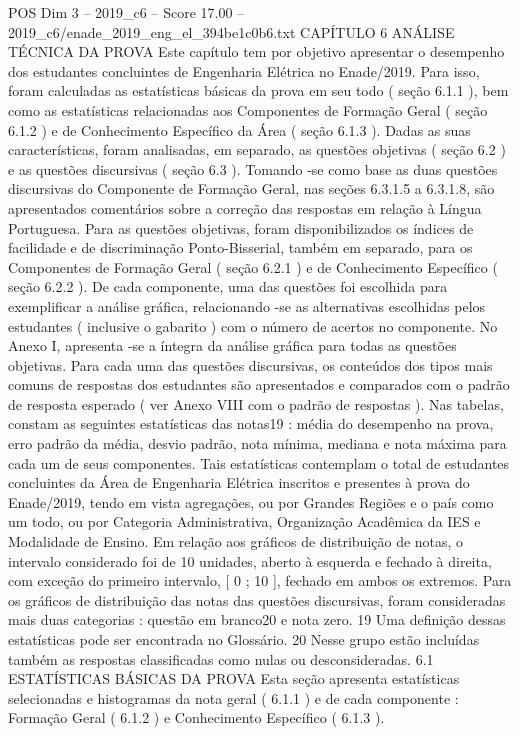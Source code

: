 \begin{textsample}{POS Dim 3 – 2019\_c6 – Score 17.00 – 2019\_c6/enade\_2019\_eng\_el\_394be1c0b6.txt}  \label{ex:f3_pos_007}
CAPÍTULO 6 ANÁLISE TÉCNICA DA PROVA Este capítulo tem por objetivo apresentar o desempenho dos estudantes concluintes de Engenharia Elétrica no Enade/2019.
Para isso, foram calculadas as estatísticas básicas da prova em seu todo ( seção 6.1.1 ), bem como as estatísticas relacionadas aos Componentes de Formação Geral ( seção 6.1.2 ) e de Conhecimento Específico da Área ( seção 6.1.3 ).
Dadas as suas características, foram analisadas, em separado, as questões objetivas ( seção 6.2 ) e as questões discursivas ( seção 6.3 ).
Tomando -se como base as duas questões discursivas do Componente de Formação Geral, nas seções 6.3.1.5 a 6.3.1.8, são apresentados comentários sobre a correção das respostas em relação à Língua Portuguesa.
Para as questões objetivas, foram disponibilizados os índices de facilidade e de discriminação Ponto-Bisserial, também em separado, para os Componentes de Formação Geral ( seção 6.2.1 ) e de Conhecimento Específico ( seção 6.2.2 ).
De cada componente, uma das questões foi escolhida para exemplificar a análise gráfica, relacionando -se as alternativas escolhidas pelos estudantes ( inclusive o gabarito ) com o número de acertos no componente.
No Anexo I, apresenta -se a íntegra da análise gráfica para todas as questões objetivas.
Para cada uma das questões discursivas, os conteúdos dos tipos mais comuns de respostas dos estudantes são apresentados e comparados com o padrão de resposta esperado ( ver Anexo VIII com o padrão de respostas ).
Nas tabelas, constam as seguintes estatísticas das notas19 : média do desempenho na prova, erro padrão da média, desvio padrão, nota mínima, mediana e nota máxima para cada um de seus componentes.
Tais estatísticas contemplam o total de estudantes concluintes da Área de Engenharia Elétrica inscritos e presentes à prova do Enade/2019, tendo em vista agregações, ou por Grandes Regiões e o país como um todo, ou por Categoria Administrativa, Organização Acadêmica da IES e Modalidade de Ensino.
Em relação aos gráficos de distribuição de notas, o intervalo considerado foi de 10 unidades, aberto à esquerda e fechado à direita, com exceção do primeiro intervalo, [ 0 ; 10 ], fechado em ambos os extremos.
Para os gráficos de distribuição das notas das questões discursivas, foram consideradas mais duas categorias : questão em branco20 e nota zero. 19 Uma definição dessas estatísticas pode ser encontrada no Glossário. 20 Nesse grupo estão incluídas também as respostas classificadas como nulas ou desconsideradas. 6.1 ESTATÍSTICAS BÁSICAS DA PROVA Esta seção apresenta estatísticas selecionadas e histogramas da nota geral ( 6.1.1 ) e de cada componente : Formação Geral ( 6.1.2 ) e Conhecimento Específico ( 6.1.3 ).

\end{textsample}
